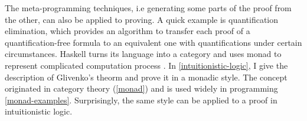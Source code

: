 The meta-programming techniques, i.e generating some parts of
the proof from the other, can also be applied to proving. A quick example
is quantification elimination, which provides an algorithm to transfer
each proof of a quantification-free formula to an equivalent one with
quantifications under certain circumstances. Haskell
turns its language into a category and uses monad to represent
complicated computation process 
\cite{the-essence-of-functional-programming}. 
In \autoref{intuitionistic-logic}, I give the description of Glivenko's 
theorm and prove it in a monadic style. The concept originated 
in category theory (\autoref{monad}) and is used widely in programming 
\autoref{monad-examples}. Surprisingly, the same style can be applied to 
a proof in intuitionistic logic.
